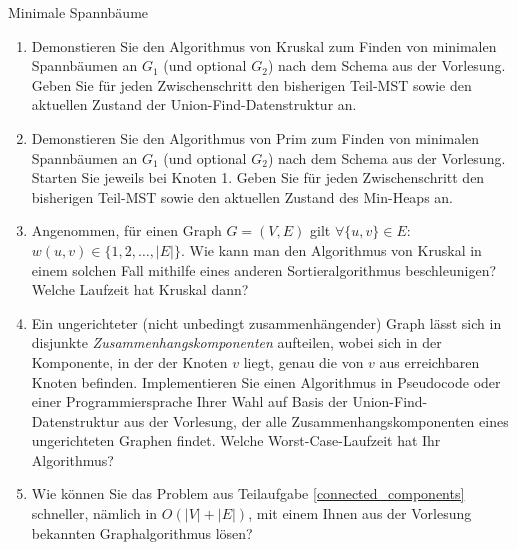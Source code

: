 \documentclass[11pt,a4paper]{article}
\begin{document}
\begin{aufgabe}{2}{Minimale Spannbäume}
\begin{figure}[h!]
\begin{subfigure}{0.34\textwidth}
        \end{subfigure}
    \end{figure}
    \FloatBarrier
    \begin{enumerate}[label=\alph*)]
        \item Demonstieren Sie den Algorithmus von Kruskal zum Finden von minimalen Spannbäumen an $G_1$ (und optional $G_2$) nach dem Schema aus der Vorlesung.
        Geben Sie für jeden Zwischenschritt den bisherigen Teil-MST sowie den aktuellen Zustand der Union-Find-Datenstruktur an.
        \item Demonstieren Sie den Algorithmus von Prim zum Finden von minimalen Spannbäumen an $G_1$ (und optional $G_2$) nach dem Schema aus der Vorlesung.
        Starten Sie jeweils bei Knoten 1.
        Geben Sie für jeden Zwischenschritt den bisherigen Teil-MST sowie den aktuellen Zustand des Min-Heaps an.
        \item \hard Angenommen, für einen Graph $G=(V,E)$ gilt $\forall \{u, v\} \in E$: $w(u, v) \in \{1, 2, \ldots, |E|\}$.
        Wie kann man den Algorithmus von Kruskal in einem solchen Fall mithilfe eines anderen Sortieralgorithmus beschleunigen?
        Welche Laufzeit hat Kruskal dann?
        \item\label{connected_components} \hard Ein ungerichteter (nicht unbedingt zusammenhängender) Graph lässt sich in disjunkte \emph{Zusammenhangskomponenten} aufteilen, wobei sich in der Komponente, in der der Knoten $v$ liegt, genau die von $v$ aus erreichbaren Knoten befinden.
        Implementieren Sie einen Algorithmus in Pseudocode oder einer Programmiersprache Ihrer Wahl auf Basis der Union-Find-Datenstruktur aus der Vorlesung, der alle Zusammenhangskomponenten eines ungerichteten Graphen findet.
        Welche Worst-Case-Laufzeit hat Ihr Algorithmus?
        \item
        \hard Wie können Sie das Problem aus Teilaufgabe \ref*{connected_components} schneller, nämlich in $O(|V| + |E|)$, mit einem Ihnen aus der Vorlesung bekannten Graphalgorithmus lösen?
    \end{enumerate}
\end{aufgabe}
\end{document}
